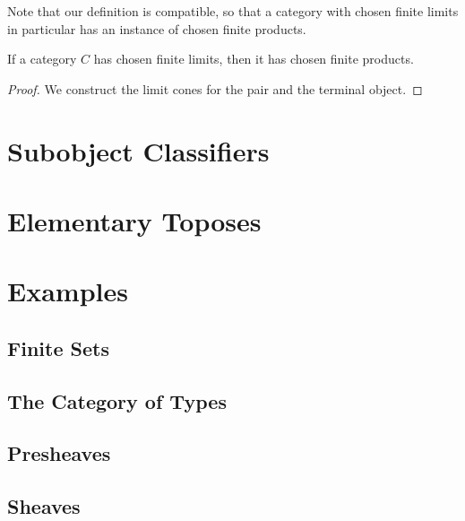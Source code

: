 Note that our definition is compatible, so that a category with chosen finite limits in particular has an instance of chosen finite products.

\begin{lemma}
  \label{lem:chosen-finite-products-from-limits}
  \leanok
{}
If a category $C$ has chosen finite limits, then it has chosen finite products.
\end{lemma}

\begin{proof}
  We construct the limit cones for the pair and the terminal object.
  \leanok
\end{proof}

\section{Subobject Classifiers}
\section{Elementary Toposes}
\section{Examples}
\subsection{Finite Sets}
\subsection{The Category of Types}
\subsection{Presheaves}
\subsection{Sheaves}
